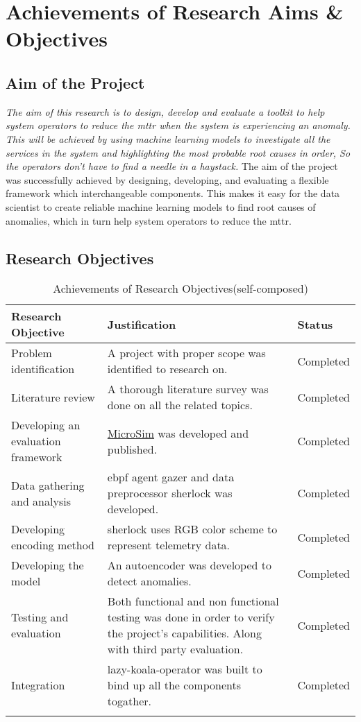 \section{Achievements of Research Aims \& Objectives}

\subsection{Aim of the Project}

\textit{The aim of this research is to design, develop and evaluate a toolkit to help system operators to reduce the \ac{mttr} when the system is experiencing an anomaly. This will be achieved by using machine learning models to investigate all the services in the system and highlighting the most probable root causes in order, So the operators don’t have to find a needle in a haystack.} The aim of the project was successfully achieved by designing, developing, and evaluating a flexible framework which interchangeable components. This makes it easy for the data scientist to create reliable machine learning models to find root causes of anomalies, which in turn help system operators to reduce the \ac{mttr}.


\subsection{Research Objectives}

\begin{longtable}{|p{40mm}|p{91mm}|p{20mm}|}
    \hline
    \textbf{Research Objective} & \textbf{Justification} & \textbf{Status} \\ \hline
    Problem identification & A project with proper scope was identified to research on. & Completed \\ \hline
    Literature review & A thorough literature survey was done on all the related topics. & Completed \\ \hline
    Developing an evaluation framework & \href{https://github.com/MrSupiri/MicroSim}{MicroSim} was developed and published. & Completed \\ \hline
    Data gathering and analysis & \ac{ebpf} agent \ac{gazer} and data preprocessor \ac{sherlock} was developed. & Completed \\ \hline
    Developing encoding method & \ac{sherlock} uses RGB color scheme to represent telemetry data. & Completed \\ \hline
    Developing the model & An autoencoder was developed to detect anomalies. & Completed \\ \hline
    Testing and evaluation & Both functional and non functional testing was done in order to verify the project’s capabilities. Along with third party evaluation. & Completed \\ \hline
    Integration & \ac{lazy-koala-operator} was built to bind up all the components togather. & Completed \\ \hline
    \caption{Achievements of Research Objectives(self-composed)}
  \end{longtable}
  
  
